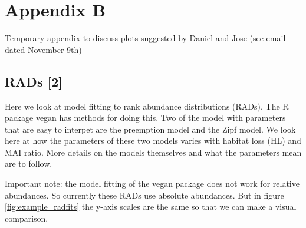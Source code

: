 
\chapter{Appendix B}
\label{app:app0b}

Temporary appendix to discuss plots suggested by Daniel and Jose (see email dated November 9th)




\section{RADs [2]}
\label{sec:rads}

Here we look at model fitting to rank abundance distributions (RADs). The R package vegan has methods for doing this. Two of the model with parameters that are easy to interpet are the preemption model and the Zipf model. We look here at how the parameters of these two models varies with habitat loss (HL) and MAI ratio. More details on the models themselves and what the parameters mean are to follow.

Important note: the model fitting of the vegan package does not work for relative abundances. So currently these RADs use absolute abundances. But in figure \ref{fig:example_radfits} the y-axis scales are the same so that we can make a visual comparison. 

